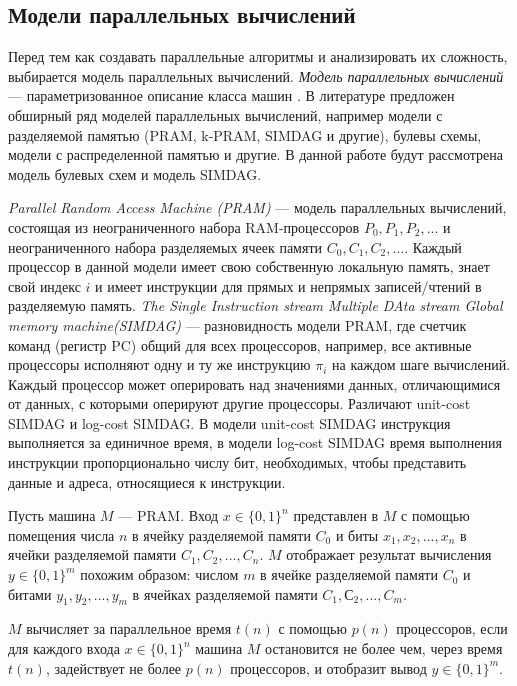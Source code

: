\documentclass{spbau-diploma}
\begin{document}
\subsection{Модели параллельных вычислений}
Перед тем как создавать параллельные алгоритмы и анализировать их сложность, выбирается модель параллельных вычислений. \textit{Модель параллельных вычислений} --- параметризованное описание класса машин \cite{PCompl}. В литературе предложен обширный ряд моделей параллельных вычислений, например модели с разделяемой памятью (PRAM, k-PRAM, SIMDAG и другие), булевы схемы, модели с распределенной памятью и другие. В данной работе будут рассмотрена модель булевых схем и модель SIMDAG. \par
\textit{Parallel Random Access Machine (PRAM)} --- модель параллельных вычислений, состоящая из неограниченного набора RAM-процессоров $P_0, P_1, P_2, ... $ и неограниченного набора разделяемых ячеек памяти $C_0, C_1, C_2, ... $. Каждый процессор в данной модели имеет свою собственную локальную память, знает свой индекс $i$ и имеет инструкции для прямых и непрямых записей/чтений в разделяемую память. \textit{The Single Instruction stream Multiple DAta stream Global memory machine(SIMDAG)} --- разновидность модели PRAM, где счетчик команд (регистр PC) общий для всех процессоров, например, все активные процессоры исполняют одну и ту же инструкцию $\pi_i$ на каждом шаге вычислений. Каждый процессор может оперировать над значениями данных, отличающимися от данных, с которыми оперируют другие процессоры. Различают unit-cost SIMDAG и log-cost SIMDAG. В модели unit-cost SIMDAG инструкция выполняется за единичное время, в модели log-cost SIMDAG время выполнения инструкции пропорционально числу бит, необходимых, чтобы представить данные и адреса, относящиеся к инструкции.
\par
Пусть машина $M$ --- PRAM. Вход $x \in {\{0, 1\}}^n$ представлен в $M$ с помощью помещения числа $n$ в ячейку разделяемой памяти $C_0$ и биты $x_1, x_2, ..., x_n$ в ячейки разделяемой памяти $C_1, C_2, ..., C_n$. $M$ отображает результат вычисления $y \in {\{0, 1\}}^m$ похожим образом: числом $m$ в ячейке разделяемой памяти $C_0$ и битами $y_1, y_2, ..., y_m$ в ячейках разделяемой памяти $C_1,  С_2, ..., C_m$. 
\par
$M$ вычисляет за параллельное время $t(n)$ с помощью $p(n)$ процессоров, если для каждого входа $x \in {\{0, 1\}}^n$ машина $M$ остановится не более чем, через время $t(n)$, задействует не более $p(n)$ процессоров, и отобразит вывод $y \in {\{0, 1\}}^m$.
\par
\end{document}
